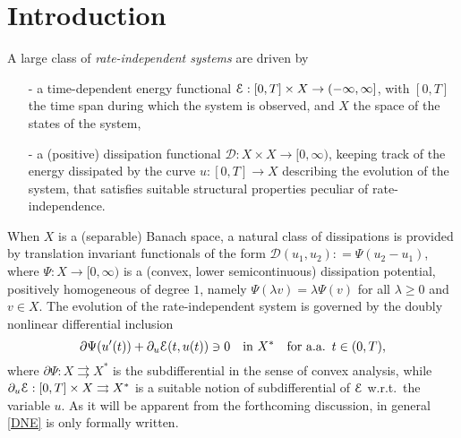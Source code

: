 \documentclass[a4paper,10pt,reqno]{amsart} %
\numberwithin{equation}{section}
\newcommand{\foraa}{\text{for a.a.\ }}
\newcommand{\Xs}{X}
\begin{document}
\section{Introduction}
A large class of  \emph{rate-independent systems} are driven by
 \begin{itemize}
 \item[-]
  a time-dependent energy functional $\calE: [0,T]\times \Xs \to (-\infty,\infty]$, with $[0,T]$ the time span during which the system is observed, and $\Xs$ the space of the states of the system, 
\item[-]
 a (positive) dissipation functional $\mathcal{D}: \Xs \times \Xs \to [0,\infty)$, keeping track of the energy dissipated by the curve $u:[0,T]\to \Xs$ describing the evolution of the system, %
  that satisfies suitable structural properties 
 peculiar of rate-independence. 
\end{itemize} 
\par
When $\Xs$ is a (separable) Banach space, 
a natural class of dissipations is provided by translation invariant functionals of the form $\mathcal{D}
(u_1,u_2): = \Psi(u_2{-}u_1)$, where 
$\Psi: \Xs \to [0,\infty)$ is a  (convex, lower semicontinuous) dissipation potential, 
  positively homogeneous of degree $1$, namely $\Psi(\lambda v) = \lambda \Psi(v)$ for all $\lambda\geq0$ and $v\in \Xs$.
The evolution of the rate-independent system %
is governed by the   doubly nonlinear differential inclusion 
\begin{equation}
\label{DNE}
\partial \Psi(u'(t)) + \partial_u \calE(t,u(t)) \ni 0 \quad \text{in } \Xs^* \quad \foraa\, t \in (0,T),
\end{equation}
where 
 $\partial\Psi: X \rightrightarrows X^*$ is the subdifferential in the sense of convex analysis, while  $\partial_u {\mathcal E} : [0,T] \times X \rightrightarrows X^*$ is a suitable notion of subdifferential  of ${\mathcal E}$ w.r.t.\ the variable $u$. 
As it will be apparent from the forthcoming discussion,  in general \eqref{DNE} is only formally written. %
\par
\end{document}
